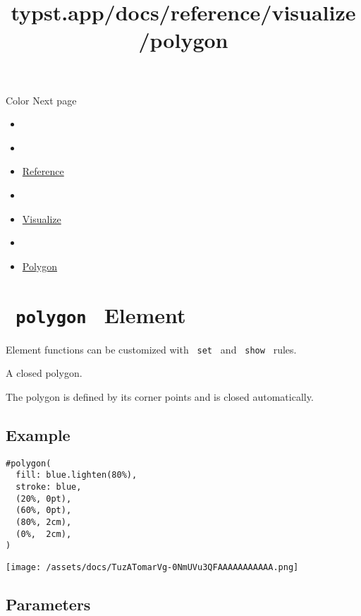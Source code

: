 \href{/docs/reference/visualize/color/}{\pandocbounded{}}

{ Color } { Next page }


\title{typst.app/docs/reference/visualize/polygon}

\begin{itemize}
\tightlist
\item
  \href{/docs}{}
\item
  
\item
  \href{/docs/reference/}{Reference}
\item
  
\item
  \href{/docs/reference/visualize/}{Visualize}
\item
  
\item
  \href{/docs/reference/visualize/polygon/}{Polygon}
\end{itemize}

\section{\texorpdfstring{\texttt{\ polygon\ } {{ Element
}}}{ polygon   Element }}\label{summary}

\label{element-tooltip}
Element functions can be customized with \texttt{\ set\ } and
\texttt{\ show\ } rules.

A closed polygon.

The polygon is defined by its corner points and is closed automatically.

\subsection{Example}\label{example}

\begin{verbatim}
#polygon(
  fill: blue.lighten(80%),
  stroke: blue,
  (20%, 0pt),
  (60%, 0pt),
  (80%, 2cm),
  (0%,  2cm),
)
\end{verbatim}

\texttt{[image: /assets/docs/TuzATomarVg-0NmUVu3QFAAAAAAAAAAA.png]}

\subsection{\texorpdfstring{{ Parameters
}}{ Parameters }}\label{parameters}

